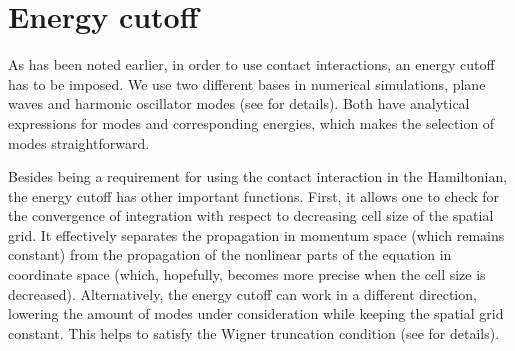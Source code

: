 \section{Energy cutoff}

As has been noted earlier, in order to use contact interactions, an energy cutoff has to be imposed.
We use two different bases in numerical simulations, plane waves and harmonic oscillator modes (see  for details).
Both have analytical expressions for modes and corresponding energies, which makes the selection of modes straightforward.

Besides being a requirement for using the contact interaction in the Hamiltonian, the energy cutoff has other important functions.
First, it allows one to check for the convergence of integration with respect to decreasing cell size of the spatial grid.
It effectively separates the propagation in momentum space (which remains constant) from the propagation of the nonlinear parts of the equation in coordinate space (which, hopefully, becomes more precise when the cell size is decreased).
Alternatively, the energy cutoff can work in a different direction, lowering the amount of modes under consideration while keeping the spatial grid constant.
This helps to satisfy the Wigner truncation condition (see  for details).
